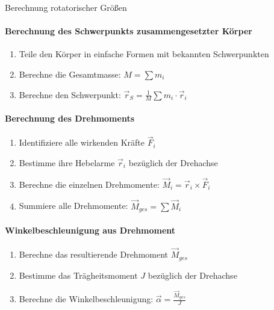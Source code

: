 \begin{KR}{Berechnung rotatorischer Größen}\\
    \paragraph{Berechnung des Schwerpunkts zusammengesetzter Körper}
    \begin{enumerate}
        \item Teile den Körper in einfache Formen mit bekannten Schwerpunkten
        \item Berechne die Gesamtmasse: $M = \sum m_i$
        \item Berechne den Schwerpunkt: $\vec{r}_S = \frac{1}{M} \sum m_i \cdot \vec{r}_i$
    \end{enumerate}
    
    \paragraph{Berechnung des Drehmoments}
    \begin{enumerate}
        \item Identifiziere alle wirkenden Kräfte $\vec{F}_i$
        \item Bestimme ihre Hebelarme $\vec{r}_i$ bezüglich der Drehachse
        \item Berechne die einzelnen Drehmomente: $\vec{M}_i = \vec{r}_i \times \vec{F}_i$
        \item Summiere alle Drehmomente: $\vec{M}_{ges} = \sum \vec{M}_i$
    \end{enumerate}
    
    \paragraph{Winkelbeschleunigung aus Drehmoment}
    \begin{enumerate}
        \item Berechne das resultierende Drehmoment $\vec{M}_{ges}$
        \item Bestimme das Trägheitsmoment $J$ bezüglich der Drehachse
        \item Berechne die Winkelbeschleunigung: $\vec{\alpha} = \frac{\vec{M}_{ges}}{J}$
    \end{enumerate}
\end{KR}


